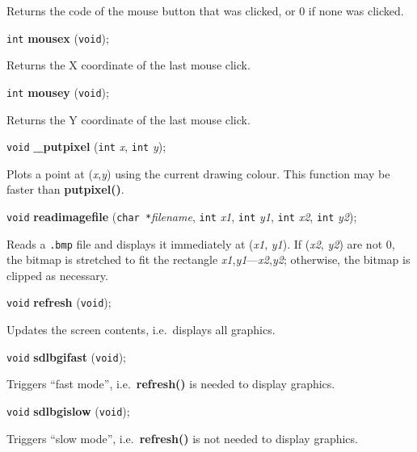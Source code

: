 \documentclass[a4paper,11pt]{article}
\newcommand{\V}{\texttt{void}}      %
\newcommand{\I}{\texttt{int}}       %
\newcommand{\C}{\texttt{char *}}    %
\newcommand{\func}[1]{\textbf{#1}}  %
\newcommand{\A}[1]{\emph{#1}}       %
\newcommand{\F}[1]{\texttt{#1}}     %
\newenvironment{bgi}
{ %
  \begin{snugshade}
}
{ %
  \end{snugshade}
}
\begin{document}
Returns the code of the mouse button that was clicked, or 0 if none
was clicked.


\begin{bgi}
\I{} \func{mousex} (\V{});
\end{bgi}

Returns the X coordinate of the last mouse click.


\begin{bgi}
\I{} \func{mousey} (\V{});
\end{bgi}

Returns the Y coordinate of the last mouse click.


\begin{bgi}
\V{} \func{\_putpixel} (\I{} \A{x}, \I{} \A{y}); 
\end{bgi}

Plots a point at (\A{x},\A{y}) using the current drawing colour. This
function may be faster than \func{putpixel()}.


\begin{bgi}
\V{} \func{readimagefile} (\C{}\A{filename}, \I{} \A{x1}, \I{} \A{y1}, 
\I{} \A{x2}, \I{} \A{y2});
\end{bgi}

Reads a \F{.bmp} file and displays it immediately at (\A{x1}, \A{y1}).
If (\A{x2}, \A{y2}) are not 0, the bitmap is stretched to fit the
rectangle \A{x1},\A{y1}---\A{x2},\A{y2}; otherwise, the bitmap is
clipped as necessary.


\begin{bgi}
\V{} \func{refresh} (\V{}); 
\end{bgi}

Updates the screen contents, i.e.\ displays all graphics.


\begin{bgi}
\V{} \func{sdlbgifast} (\V{}); 
\end{bgi}

Triggers ``fast mode'', i.e.\ \func{refresh()} is needed to display
graphics.


\begin{bgi}
\V{} \func{sdlbgislow} (\V{}); 
\end{bgi}

Triggers ``slow mode'', i.e.\ \func{refresh()} is not needed to
display graphics.
\end{document}
